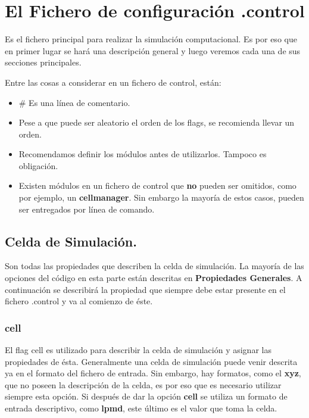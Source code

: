 \section{El Fichero de configuraci\'on .control}

Es el fichero principal para realizar la simulaci\'on computacional. Es por eso que en primer lugar se har\'a una descripci\'on general y luego veremos cada una de sus secciones principales.

Entre las cosas a considerar en un fichero de control, est\'an:

\begin{itemize}
 \item \# Es una l\'inea de comentario.
 \item Pese a que puede ser aleatorio el orden de los flags, se recomienda llevar un orden.
 \item Recomendamos definir los m\'odulos antes de utilizarlos. Tampoco es obligaci\'on.
 \item Existen m\'odulos en un fichero de control que \textbf{no} pueden ser omitidos, como por ejemplo, un \textbf{cellmanager}. Sin embargo la mayor\'ia de estos casos, pueden ser entregados por l\'inea de comando.
\end{itemize}

\subsection{Celda de Simulaci\'on.}

Son todas las propiedades que describen la celda de simulaci\'on. La mayor\'ia de las opciones del c\'odigo en esta parte est\'an descritas en \textbf{Propiedades Generales}. A continuaci\'on se describir\'a la propiedad que siempre debe estar presente en el fichero .control y va al comienzo de \'este.

\subsubsection{cell}

El flag cell es utilizado para describir la celda de simulaci\'on y asignar las propiedades de \'esta. Generalmente una celda de simulaci\'on puede venir descrita ya en el formato del fichero de entrada. Sin embargo, hay formatos, como el \textbf{xyz}, que no poseen la descripci\'on de la celda, es por eso que es necesario utilizar siempre esta opci\'on. Si despu\'es de dar la opci\'on \textbf{cell} se utiliza un formato de entrada descriptivo, como \textbf{lpmd}, este \'ultimo es el valor que toma la celda.

